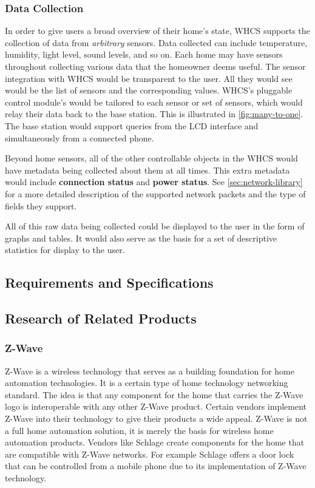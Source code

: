 \subsubsection{Data Collection}
In order to give users a broad overview of their home's state, WHCS supports
the collection of data from \emph{arbitrary} sensors. Data collected can
include temperature, humidity, light level, sound levels, and so on. Each home
may have sensors throughout collecting various data that the homeowner deems
useful. The sensor integration with WHCS would be transparent to the user. All
they would see would be the list of sensors and the corresponding values.
WHCS's pluggable control module's would be tailored to each sensor or set of
sensors, which would relay their data back to the base station. This is
illustrated in \autoref{fig:many-to-one}. The base station would support
queries from the LCD interface and simultaneously from a connected phone.


Beyond home sensors, all of the other controllable objects in the WHCS
would have metadata being collected about them at all times. This extra metadata
would include \textbf{connection status} and \textbf{power status}. See
\autoref{sec:network-library} for a more detailed description of the supported
network packets and the type of fields they support.

All of this raw data being collected could be displayed to the user in the form
of graphs and tables. It would also serve as the basis for a set of descriptive
statistics for display to the user.

\subsection{Requirements and Specifications}

\subsection{Research of Related Products}

\subsubsection{Z-Wave}
Z{}-Wave is a wireless technology that serves as a building foundation for home
automation technologies. It is a certain type of home technology networking
standard. The idea is that any component for the home that carries the Z{}-Wave
logo is interoperable with any other Z{}-Wave product. Certain vendors
implement Z{}-Wave into their technology to give their products a wide appeal.
Z{}-Wave is not a full home automation solution, it is merely the basis for
wireless home automation products. Vendors like Schlage create components for
the home that are compatible with Z{}-Wave networks.  For example Schlage
offers a door lock that can be controlled from a mobile phone due to its
implementation of Z{}-Wave technology.

